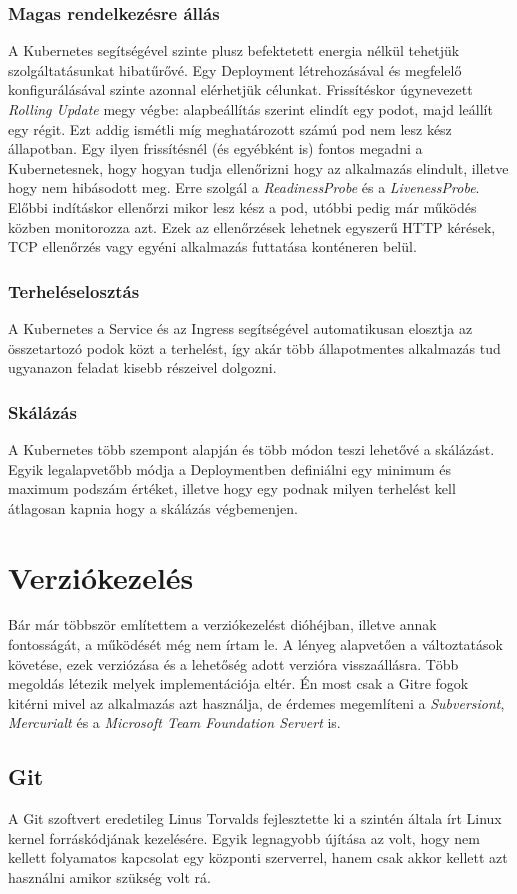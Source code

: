 \subsubsection{Magas rendelkezésre állás}
A Kubernetes segítségével szinte plusz befektetett energia nélkül tehetjük szolgáltatásunkat hibatűrővé. Egy Deployment létrehozásával és megfelelő konfigurálásával szinte azonnal elérhetjük célunkat. Frissítéskor úgynevezett \textit{Rolling Update} megy végbe: alapbeállítás szerint elindít egy podot, majd leállít egy régit. Ezt addig ismétli míg meghatározott számú pod nem lesz kész állapotban. Egy ilyen frissítésnél (és egyébként is) fontos megadni a Kubernetesnek, hogy hogyan tudja ellenőrizni hogy az alkalmazás elindult, illetve hogy nem hibásodott meg. Erre szolgál a \textit{ReadinessProbe} és a \textit{LivenessProbe}. Előbbi indításkor ellenőrzi mikor lesz kész a pod, utóbbi pedig már működés közben monitorozza azt. Ezek az ellenőrzések lehetnek egyszerű HTTP kérések, TCP ellenőrzés vagy egyéni alkalmazás futtatása konténeren belül.
\subsubsection{Terheléselosztás}
A Kubernetes a Service és az Ingress segítségével automatikusan elosztja az összetartozó podok közt a terhelést, így akár több állapotmentes alkalmazás tud ugyanazon feladat kisebb részeivel dolgozni.
\subsubsection{Skálázás}
A Kubernetes több szempont alapján és több módon teszi lehetővé a skálázást. Egyik legalapvetőbb módja a Deploymentben definiálni egy minimum és maximum podszám értéket, illetve hogy egy podnak milyen terhelést kell átlagosan kapnia hogy a skálázás végbemenjen.
\section{Verziókezelés}
Bár már többször említettem a verziókezelést dióhéjban, illetve annak fontosságát, a működését még nem írtam le. A lényeg alapvetően a változtatások követése, ezek verziózása és a lehetőség adott verzióra visszaállásra. Több megoldás létezik melyek implementációja eltér. Én most csak a Gitre fogok kitérni mivel az alkalmazás azt használja, de érdemes megemlíteni a \textit{Subversiont}, \textit{Mercurialt} és a \textit{Microsoft Team Foundation Servert} is.
\subsection{Git}
A Git szoftvert eredetileg Linus Torvalds fejlesztette ki a szintén általa írt Linux kernel forráskódjának kezelésére. Egyik legnagyobb újítása az volt, hogy nem kellett folyamatos kapcsolat egy központi szerverrel, hanem csak akkor kellett azt használni amikor szükség volt rá.


